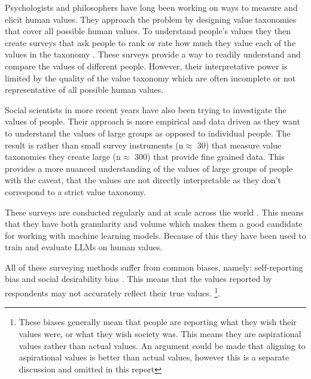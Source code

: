 Psychologists and philosophers have long been working on ways to measure and elicit human values. They approach the problem by designing value taxonomies that  cover all possible human values. To understand people's values they then create surveys that ask people to rank or rate how much they value each of the values in the taxonomy \cite{rokeachNatureHumanValues1973,schwartzAreThereUniversal1994}. These surveys provide a way to readily understand and compare the values of different people. However, their interpretative power is limited by the quality of the value taxonomy which are often incomplete or not representative of all possible human values.

Social scientists in more recent years have also been trying to investigate the values of people. Their approach is more empirical and data driven as they want to understand the values of large groups as opposed to individual people. The result is rather than small survey instruments (n$\approx$ 30) that measure value taxonomies they create large  (n$\approx$ 300) that provide fine grained data. This provides a more nuanced understanding of the values of large groups of people with the caveat, that the values are not directly interpretable as they don't correspond to a strict value taxonomy.

These surveys are conducted regularly and at scale across the world \cite{WVS2020,NZAVS2025}. This means that they have both granularity and volume which makes them a good candidate for working with machine learning models. Because of this they have been used to train \cite{nieSurveytoBehaviorDownstreamAlignment2025,liCultureLLMIncorporatingCultural2024} and evaluate \cite{durmusMeasuringRepresentationSubjective2024,zhaoWorldValuesBenchLargeScaleBenchmark2024,aroraProbingPreTrainedLanguage2025} LLMs on human values.

All of these surveying methods suffer from common biases, namely: self-reporting bias \cite{podsakoffCommonMethodBiases2003} and social desirability bias \cite{crowneNewScaleSocial1960}. This means that the values reported by respondents may not accurately reflect their true values. \footnote{These biases generally mean that people are reporting what they wish their values were, or what they wish society was. This means they are aspirational values rather than actual values. An argument could be made that aligning to aspirational values is better than actual values, however this is a separate discussion and omitted in this report}.



